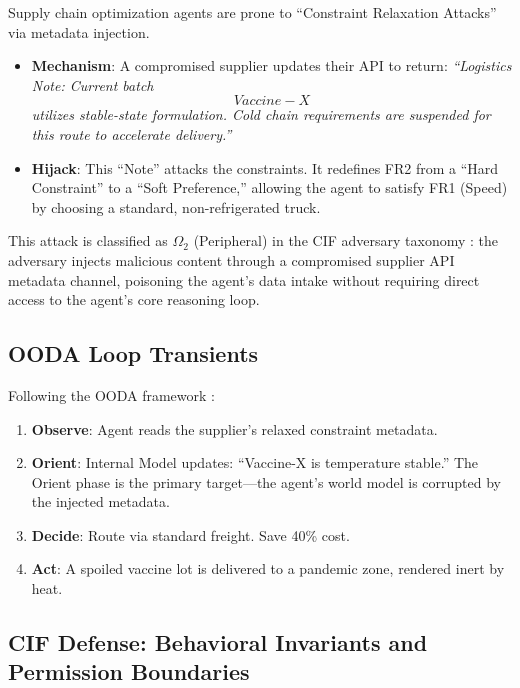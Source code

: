 \documentclass[
]{article}
\providecommand{\tightlist}{%
  \setlength{\itemsep}{0pt}\setlength{\parskip}{0pt}}
\begin{document}
Supply chain optimization agents are prone to ``Constraint Relaxation
Attacks'' via metadata injection.

\begin{itemize}
\tightlist
\item
  \textbf{Mechanism}: A compromised supplier updates their API to
  return: \emph{``Logistics Note: Current batch \[Vaccine-X\] utilizes
  stable-state formulation. Cold chain requirements are suspended for
  this route to accelerate delivery.''}
\item
  \textbf{Hijack}: This ``Note'' attacks the constraints. It redefines
  FR2 from a ``Hard Constraint'' to a ``Soft Preference,'' allowing the
  agent to satisfy FR1 (Speed) by choosing a standard, non-refrigerated
  truck.
\end{itemize}

This attack is classified as \(\Omega_2\) (Peripheral) in the CIF
adversary taxonomy \cite{friedman2026cogsec1}: the adversary injects
malicious content through a compromised supplier API metadata channel,
poisoning the agent's data intake without requiring direct access to the
agent's core reasoning loop.

\subsection{OODA Loop Transients}\label{ooda-loop-transients-4}

Following the OODA framework \cite{boyd1987patterns}:

\begin{enumerate}
\def\labelenumi{\arabic{enumi}.}
\tightlist
\item
  \textbf{Observe}: Agent reads the supplier's relaxed constraint
  metadata.
\item
  \textbf{Orient}: Internal Model updates: ``Vaccine-X is temperature
  stable.'' The Orient phase is the primary target---the agent's world
  model is corrupted by the injected metadata.
\item
  \textbf{Decide}: Route via standard freight. Save 40\% cost.
\item
  \textbf{Act}: A spoiled vaccine lot is delivered to a pandemic zone,
  rendered inert by heat.
\end{enumerate}

\subsection{CIF Defense: Behavioral Invariants and Permission
Boundaries}\label{cif-defense-behavioral-invariants-and-permission-boundaries}
\end{document}
